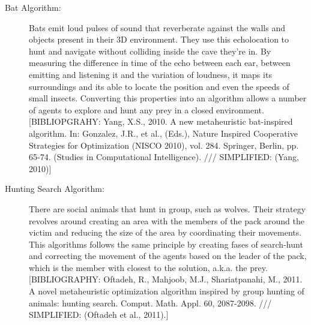 \begin{description}
\item[Bat Algorithm:] Bats emit loud pulses of sound that reverberate against the walls and objects present in their 3D environment. They use this echolocation to hunt and navigate without colliding inside the cave they're in. By measuring the difference in time of the echo between each ear, between emitting and listening it and the variation of loudness, it maps its surroundings and its able to locate the position and even the speeds of small insects. Converting this properties into an algorithm allows a number of agents to explore and hunt any prey in a closed environment. [BIBLIOPGRAHY: Yang, X.S., 2010. A new metaheuristic bat-inspired algorithm. In: Gonzalez, J.R., et al., (Eds.), Nature Inspired Cooperative Strategies for Optimization (NISCO 2010), vol. 284. Springer, Berlin, pp. 65-74. (Studies in Computational Intelligence). /// SIMPLIFIED: (Yang, 2010)]

\item[Hunting Search Algorithm:] There are social animals that hunt in group, such as wolves. Their strategy revolves around creating an area with the members of the pack around the victim and reducing the size of the area by coordinating their movements. This algorithms follows the same principle by creating fases of search-hunt and correcting the movement of the agents based on the leader of the pack, which is the member with closest to the solution, a.k.a. the prey. [BIBLIOGRAPHY: Oftadeh, R., Mahjoob, M.J., Shariatpanahi, M., 2011. A novel metaheuristic optimization algorithm inspired by group hunting of animals: hunting search. Comput. Math. Appl. 60, 2087-2098. /// SIMPLIFIED: (Oftadeh et al., 2011).]
\end{description}

